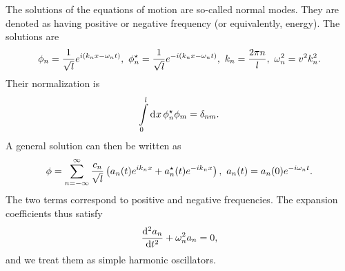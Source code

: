 The solutions of the equations of motion are so-called normal modes. They are denoted as having positive or negative frequency (or equivalently, energy). The solutions are
\begin{align*}
	\phi_{n} = \frac{1}{\sqrt{l}}e^{i(k_{n}x - \omega_{n}t)},\ \phi_{n}\cc = \frac{1}{\sqrt{l}}e^{-i(k_{n}x - \omega_{n}t)},\ k_{n} = \frac{2\pi n}{l},\ \omega_{n}^{2} = v^{2}k_{n}^{2}.
\end{align*}
Their normalization is
\begin{align*}
	\int\limits_{0}^{l}\dd[]{x}\phi_{n}^{\star}\phi_m = \delta_{nm}.
\end{align*}
A general solution can then be written as
\begin{align*}
	\phi = \sum\limits_{n = -\infty}^{\infty}\frac{c_{n}}{\sqrt{l}}\left(a_{n}(t)e^{ik_{n}x} + a_{n}^{\star}(t)e^{-ik_{n}x}\right),\ a_{n}(t) = a_{n}(0)e^{-i\omega_{n}t}.
\end{align*}
The two terms correspond to positive and negative frequencies. The expansion coefficients thus satisfy
\begin{align*}
	\dv[2]{a_{n}}{t} + \omega_{n}^{2}a_{n} = 0,
\end{align*}
and we treat them as simple harmonic oscillators.

